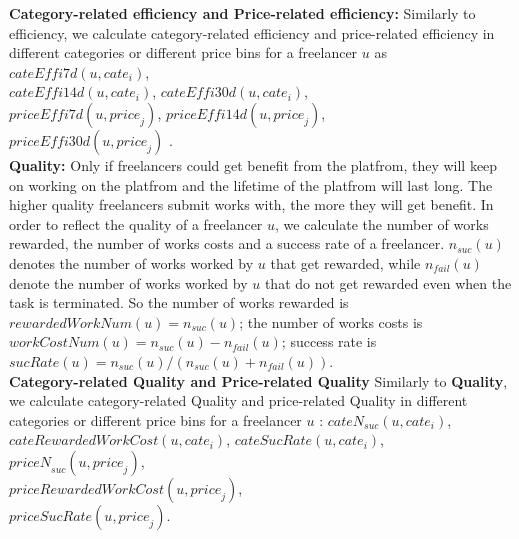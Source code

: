 \documentclass{sig-alternate-05-2015}
\begin{document}
\textbf{ Category-related efficiency and Price-related efficiency:} Similarly to efficiency,  we calculate category-related efficiency and price-related efficiency in different categories or different price bins for a freelancer $u$ as $cateEffi7d(u, {cate}_{i})$, \\$cateEffi14d(u, {cate}_{i})$, $cateEffi30d(u, {cate}_{i})$, \\$priceEffi7d(u, {price}_{j})$, $priceEffi14d(u, {price}_{j})$, \\$priceEffi30d(u, {price}_{j})$ .\\
%
\textbf{Quality:} Only if freelancers could get benefit from the platfrom, they will keep on working on the platfrom and the lifetime of the platfrom will last long. The higher quality freelancers submit works with, the more they will get benefit. In order to reflect the quality of a freelancer $u$, we calculate the number of works rewarded, the number of works costs and a success rate of a freelancer. ${n}_{suc}(u)$ denotes the number of works worked by $u$ that get rewarded, while ${n}_{fail}(u)$ denote the number of works worked by $u$ that do not get rewarded even when the task is terminated. So the number of works rewarded is $rewardedWorkNum(u)={n}_{suc}(u)$; the number of works costs is $workCostNum(u)={n}_{suc}(u) - {n}_{fail}(u)$; success rate is $sucRate(u)={n}_{suc}(u)/({n}_{suc}(u) + {n}_{fail}(u))$. \\
\textbf{ Category-related Quality and Price-related Quality} Similarly to \textbf{Quality},  we calculate category-related Quality and price-related Quality in different categories or different price bins for a freelancer $u$ : ${cateN}_{suc}(u, {cate}_{i})$, \\$cateRewardedWorkCost(u, {cate}_{i})$, $cateSucRate(u, {cate}_{i})$, \\${priceN}_{suc}(u, {price}_{j})$, \\$priceRewardedWorkCost(u, {price}_{j})$, \\$priceSucRate(u, {price}_{j})$. 
\end{document}
